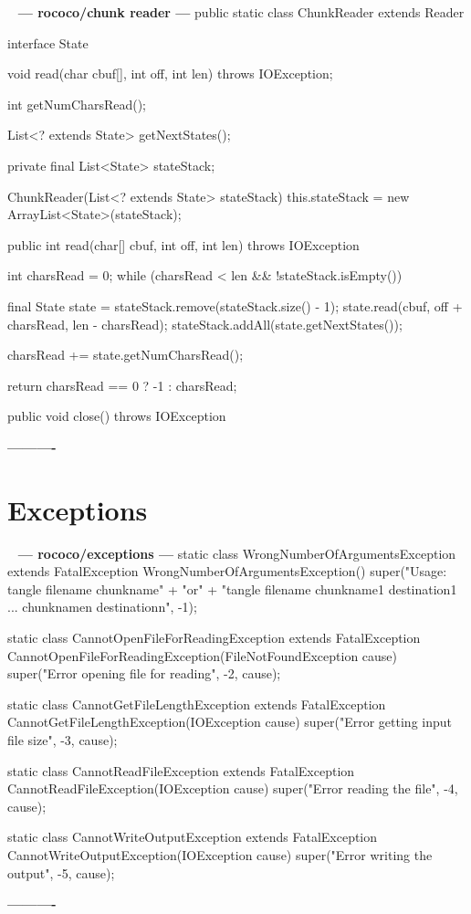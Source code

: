\documentclass{book}
\newenvironment{chunk}[1]{%
{\ }\newline\noindent%
\hbox{\hskip 2.0cm}{\bf --- #1 ---}%
\verbatim}%                               say exactly what we see
{\endverbatim%
\par{}%
\noindent{}%
\hbox{\hskip 2.0cm}{\bf ----------}%
\par%
\normalsize\noindent}%
\begin{document}
\begin{chunk}{rococo/chunk reader}
public static class ChunkReader extends Reader {
    interface State {
        void read(char cbuf[], int off, int len) throws IOException;

        int getNumCharsRead();

        List<? extends State> getNextStates();
    }

    private final List<State> stateStack;

    ChunkReader(List<? extends State> stateStack) {
        this.stateStack = new ArrayList<State>(stateStack);
    }

    public int read(char[] cbuf, int off, int len) throws IOException {
        int charsRead = 0;
        while (charsRead < len && !stateStack.isEmpty()) {
            final State state = stateStack.remove(stateStack.size() - 1);
            state.read(cbuf, off + charsRead, len - charsRead);
            stateStack.addAll(state.getNextStates());

            charsRead += state.getNumCharsRead();
        }
        return charsRead == 0 ? -1 : charsRead;
    }

    public void close() throws IOException {
    }
}
\end{chunk}

\section{Exceptions}
\begin{chunk}{rococo/exceptions}
static class WrongNumberOfArgumentsException extends FatalException {
    WrongNumberOfArgumentsException() {
        super("Usage: tangle filename chunkname\n" +
                "or\n" +
                "tangle filename chunkname1 destination1 ... chunknamen destinationn",
              -1);
    }
}

static class CannotOpenFileForReadingException extends FatalException {
    CannotOpenFileForReadingException(FileNotFoundException cause) {
        super("Error opening file for reading", -2, cause);
    }
}

static class CannotGetFileLengthException extends FatalException {
    CannotGetFileLengthException(IOException cause) {
        super("Error getting input file size", -3, cause);
    }
}

static class CannotReadFileException extends FatalException {
    CannotReadFileException(IOException cause) {
        super("Error reading the file", -4, cause);
    }
}

static class CannotWriteOutputException extends FatalException {
    CannotWriteOutputException(IOException cause) {
        super("Error writing the output", -5, cause);
    }
}
\end{chunk}
\end{document}
